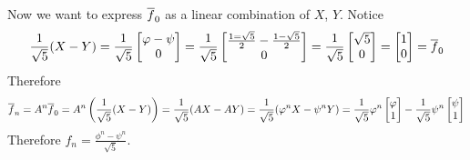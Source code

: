 \documentclass[a4paper, 11pt]{article}
\begin{document}
{\begin{itemize}[label=$\bullet$]
Now we want to express $\overline{f}_0$ as a linear combination of $X$, $Y$. Notice$$\frac1{\sqrt{5}}(X-Y)=\frac1{\sqrt{5}}\left[\begin{matrix}\varphi-\psi\\ 0\end{matrix}\right]=\frac{1}{\sqrt{5}}\left[\begin{matrix}\frac{1=\sqrt{5}}2-\frac{1-\sqrt{5}}2\\ 0\end{matrix}\right]=\frac1{\sqrt{5}}\left[\begin{matrix}\sqrt{5}\\ 0\end{matrix}\right]=\left[\begin{matrix}1\\ 0\end{matrix}\right]=\overline{f}_0$$Therefore $$\overline{f}_n=A^n\overline{f}_0=A^n\left(\frac1{\sqrt{5}}(X-Y)\right)=\frac1{\sqrt{5}}(AX-AY)=\frac1{\sqrt{5}}(\varphi^n X-\psi^n Y)=\frac1{\sqrt{5}}\varphi^n\left[\begin{matrix}\varphi\\ 1\end{matrix}\right]-\frac{1}{\sqrt{5}}\psi^n\left[\begin{matrix}\psi\\ 1\end{matrix}\right]$$Therefore $f_{n}=\frac{\phi^n-\psi^n}{\sqrt{5}}$.
\end{itemize}		
}

\end{document}
